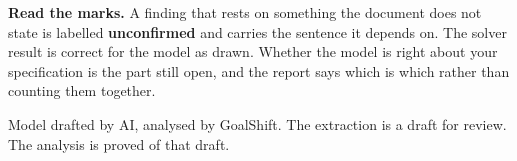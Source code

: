 \documentclass[11pt,a4paper]{article}
\begin{document}
\begin{keybox}
\textbf{Read the marks.} A finding that rests on something the document does not
state is labelled \textbf{unconfirmed} and carries the sentence it depends on. The
solver result is correct for the model as drawn. Whether the model is right about
your specification is the part still open, and the report says which is which
rather than counting them together.
\end{keybox}

\vspace{6pt}
{\footnotesize\color{muted}Model drafted by AI, analysed by GoalShift. The
extraction is a draft for review. The analysis is proved of that draft.}
\end{document}
